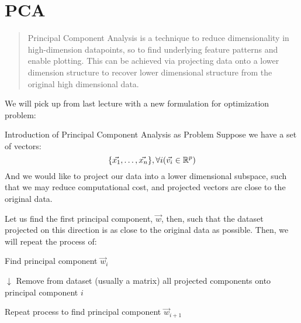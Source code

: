 \section{PCA}
\begin{quote}
    Principal Component Analysis is a technique to reduce dimensionality in high-dimension datapoints, so to find underlying feature patterns and enable plotting.
    This can be achieved via projecting data onto a lower dimension structure to recover lower dimensional structure from the original high dimensional data. \\
\end{quote}
We will pick up from last lecture with a new formulation for optimization problem:
\begin{ln-explain}{Introduction of Principal Component Analysis as Problem}{}
    Suppose we have a set of vectors:
    \[
        \{\vec{x_1}, \dots, \vec{x_n}\}, \forall i (\vec{v_i} \in \mathbb{R}^p)
    \]
    And we would like to project our data into a lower dimensional subspace, such that we may reduce computational cost, and projected vectors are close to the original data.
\end{ln-explain}
Let us find the first principal component, $\vec{w}$, then, such that the dataset projected on this direction is as close to the original data as possible. Then, we will repeat the process of:
\begin{bindenum}
    \item Find principal component $\vec{w}_i$
    \item[$\downarrow$] Remove from dataset (usually a matrix) all projected components onto principal component $i$
    \item Repeat process to find principal component $\vec{w}_{i + 1}$
\end{bindenum}

